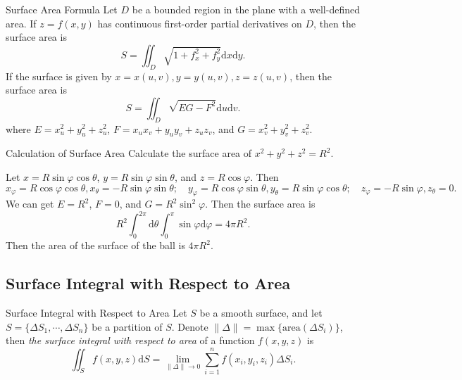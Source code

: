 \begin{proposition}{Surface Area Formula}{}
  Let $D$ be a bounded region in the plane with a well-defined area.
  If $z = f(x, y)$ has continuous first-order partial derivatives on $D$, then
  the surface area is
  \begin{equation}
    S = \iint_D \sqrt{1 + f_x^2 + f_y^2}\mathrm{d} x \mathrm{d} y.
  \end{equation}
  If the surface is given by $x = x(u, v), y = y(u, v), z = z(u, v)$, then
  the surface area is
  \begin{equation}
    S = \iint_D \sqrt{EG - F^2}\mathrm{d} u\mathrm{d}v.
  \end{equation}
  where $E = x_u^2 + y_u^2 + z_u^2$, $F = x_ux_v + y_uy_v + z_uz_v$,
  and $G = x_v^2 + y_v^2 + z_v^2$.
\end{proposition}

\begin{example}{Calculation of Surface Area}{}
  Calculate the surface area of $x^2 + y^2 + z^2 = R^2$.
\end{example}

\begin{solution}
  Let $x = R\sin\varphi \cos \theta$, $y = R \sin \varphi \sin \theta$,
  and $z = R \cos \varphi$.
  Then
  \begin{equation}
    x_{\varphi} = R \cos \varphi \cos \theta, x_{\theta} = -R \sin \varphi \sin \theta; \quad
    y_{\varphi} = R \cos \varphi \sin \theta, y_{\theta} = R \sin \varphi \cos \theta; \quad
    z_{\varphi} = -R\sin \varphi, z_{\theta} = 0.
  \end{equation}
  We can get $E = R^2$, $F = 0$, and $G = R^2 \sin^2 \varphi$.
  Then the surface area is
  \begin{equation}
    R^2\int_0^{2\pi}\mathrm{d} \theta \int_0^{\pi} \sin \varphi \mathrm{d} \varphi
    = 4\pi R^2.
  \end{equation}
  Then the area of the surface of the ball is $4\pi R^2$.
\end{solution}

\subsection{Surface Integral with Respect to Area}

\begin{definition}{Surface Integral with Respect to Area}{}
  Let $S$ be a smooth surface,
  and let $S = \{\Delta S_1, \cdots, \Delta S_n\}$ be a partition of $S$.
  Denote $\|\Delta\| = \max \{\text{area}(\Delta S_i)\}$,
  then \emph{the surface integral with respect to area} of a function $f(x, y, z)$ is
  \begin{equation}
    \iint_S f(x,y,z)\mathrm{d}S = \lim \limits _{\|\Delta\| \rightarrow 0}
    \sum\limits_{i = 1}^n f(x_i, y_i, z_i) \Delta S_i.
  \end{equation}
\end{definition}

